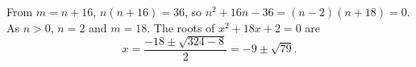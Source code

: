 From $m=n+16$, $n(n+16)=36$, so $n^2+16n-36=(n-2)(n+18)=0$. As $n>0$, $n=2$ and $m=18$. The roots of $x^2+18x+2=0$ are
\[x=\dfrac{-18\pm\sqrt{324-8}}{2}=\boxed{-9\pm\sqrt{79}}.\]
